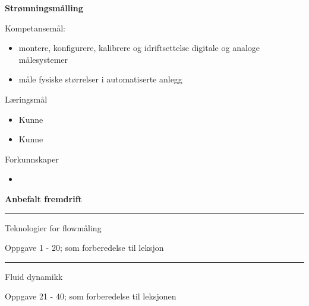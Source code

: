 \centerline{\bf Strømningsmålling}  \bigskip

Kompetansemål:
\begin{itemize}[noitemsep]

	\item montere, konfigurere, kalibrere og idriftsettelse digitale og analoge målesystemer
	\item måle fysiske størrelser i automatiserte anlegg
\end{itemize}
	Læringsmål
	\begin{itemize}[noitemsep]
		\item Kunne 
		\item Kunne 
	\end{itemize}

	Forkunnskaper

	\begin{itemize}[noitemsep]
		\item 

	\end{itemize}
\vfil \eject
\centerline{\bf Anbefalt fremdrift} 

\vskip 5pt

\filbreak
\hrule \vskip 5pt
\noindent {}

\vskip 5pt


\vskip 2pt  Teknologier for flowmåling

\vskip 2pt \noindent Oppgave 1 - 20;  som forberedelse til leksjon %

\vskip 10pt



\filbreak
\hrule \vskip 5pt
\noindent {}

\vskip 5pt


\vskip 2pt  Fluid dynamikk

\vskip 2pt \noindent Oppgave 21 - 40;  som forberedelse til leksjonen%

